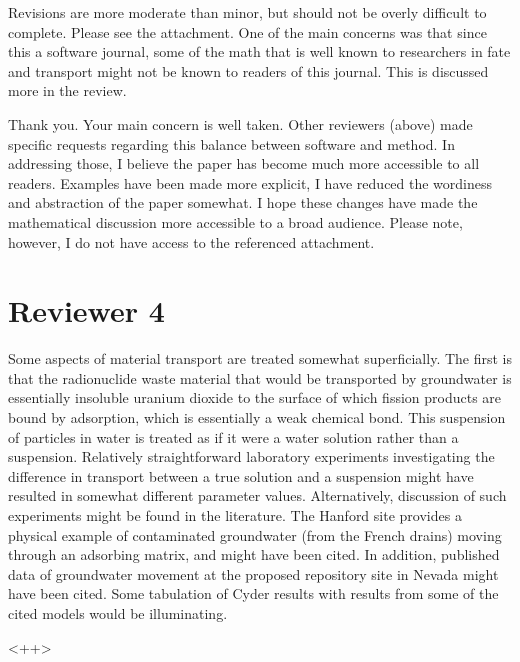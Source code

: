 \documentclass[answers,12pt]{exam}
\begin{document}
\begin{questions}
\question   Revisions are more moderate than minor, but should not be overly difficult
to complete. Please see the attachment. One of the main concerns was that since
this a software journal, some of the math that is well known to researchers in
fate and transport might not be known to readers of this journal. This is
discussed more in the review.
\begin{solution}
Thank you. Your main concern is well taken. Other reviewers (above) made 
        specific requests regarding this balance between software and method. 
        In addressing those, I believe the paper has become much more 
        accessible to all readers. Examples have been made more explicit, I 
        have reduced the wordiness and abstraction of the paper somewhat. I 
        hope these changes have made the mathematical discussion more 
        accessible to a broad audience. Please note, however, I do not have 
        access to the referenced attachment.
\end{solution}

\section*{Reviewer 4}

\question  Some aspects of material transport are treated somewhat superficially. The
first is that the radionuclide waste material that would be transported by
groundwater is essentially insoluble uranium dioxide to the surface of which
fission products are bound by adsorption, which is essentially a weak chemical
bond.  This suspension of particles in water is treated as if it were a water
solution rather than a suspension.  Relatively straightforward laboratory
experiments investigating the difference in transport between a true solution
and a suspension might have resulted in somewhat different parameter values.
Alternatively, discussion of such experiments might be found in the literature.
The Hanford site provides a physical example of contaminated groundwater (from
the French drains) moving through an adsorbing matrix, and might have been
cited. In addition, published data of groundwater movement at the proposed
repository site in Nevada might have been cited.  Some tabulation of Cyder
results with results from some of the cited models would be illuminating. 
\begin{solution}
<++>
\end{solution}

\end{questions}
  
\end{document}
